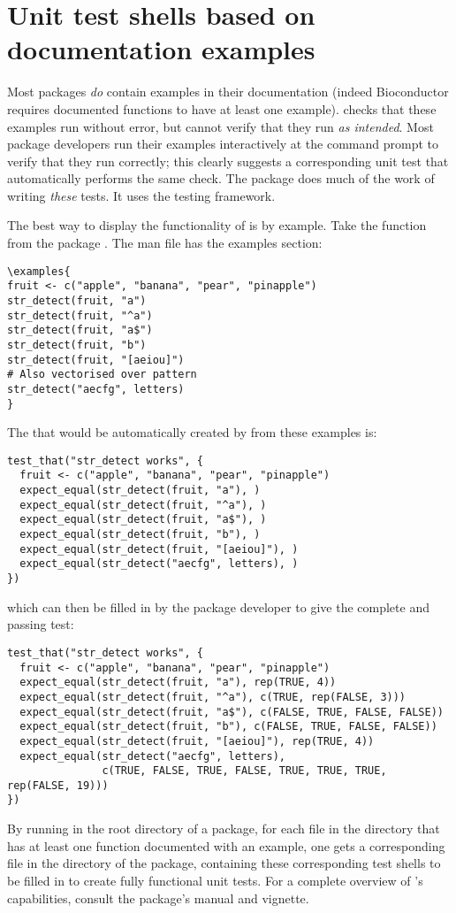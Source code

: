 \section{Unit test shells based on documentation examples}
Most packages \emph{do} contain examples in their documentation (indeed Bioconductor \citep{bioc} requires documented functions to have at least one example).  checks that these examples run without error, but cannot verify that they run \emph{as intended}. Most package developers run their examples interactively at the command prompt to verify that they run correctly; this clearly suggests a corresponding unit test that automatically performs the same check. The  package \citep{exampletestr} does much of the work of writing \emph{these} tests. It uses the  testing framework.

The best way to display the functionality of  is by example. Take the  function from the  package \citep{stringr}. The man file  has the examples section:
\begin{verbatim}
\examples{
fruit <- c("apple", "banana", "pear", "pinapple")
str_detect(fruit, "a")
str_detect(fruit, "^a")
str_detect(fruit, "a$")
str_detect(fruit, "b")
str_detect(fruit, "[aeiou]")
# Also vectorised over pattern
str_detect("aecfg", letters)
}
\end{verbatim}
The  that would be automatically created by  from these examples is:
\begin{verbatim}
test_that("str_detect works", {
  fruit <- c("apple", "banana", "pear", "pinapple")
  expect_equal(str_detect(fruit, "a"), )
  expect_equal(str_detect(fruit, "^a"), )
  expect_equal(str_detect(fruit, "a$"), )
  expect_equal(str_detect(fruit, "b"), )
  expect_equal(str_detect(fruit, "[aeiou]"), )
  expect_equal(str_detect("aecfg", letters), )
})
\end{verbatim}
which can then be filled in by the package developer to give the complete and passing test:
\begin{verbatim}
test_that("str_detect works", {
  fruit <- c("apple", "banana", "pear", "pinapple")
  expect_equal(str_detect(fruit, "a"), rep(TRUE, 4))
  expect_equal(str_detect(fruit, "^a"), c(TRUE, rep(FALSE, 3)))
  expect_equal(str_detect(fruit, "a$"), c(FALSE, TRUE, FALSE, FALSE))
  expect_equal(str_detect(fruit, "b"), c(FALSE, TRUE, FALSE, FALSE))
  expect_equal(str_detect(fruit, "[aeiou]"), rep(TRUE, 4))
  expect_equal(str_detect("aecfg", letters), 
               c(TRUE, FALSE, TRUE, FALSE, TRUE, TRUE, TRUE, rep(FALSE, 19)))
})
\end{verbatim}
By running  in the root directory of a package, for each  file in the  directory that has at least one function documented with an example, one gets a corresponding file  in the  directory of the package, containing these corresponding test shells to be filled in to create fully functional unit tests.
For a complete overview of 's capabilities, consult the package's manual and vignette. 

